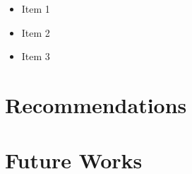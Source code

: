 \label{chapter:discussion}

\Blindtext [1] %

\begin{itemize}
\item Item 1
\item Item 2
\item Item 3
\end{itemize}


\section{Recommendations}
\Blindtext [2] %

\section{Future Works}
\Blindtext [2] %